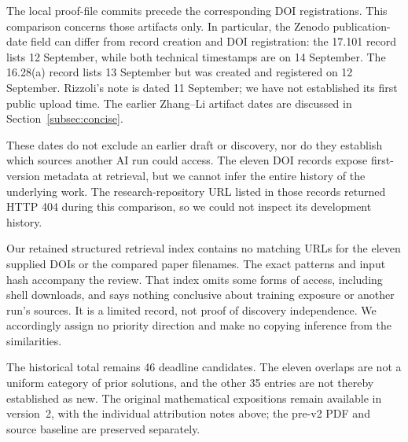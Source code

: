 

The local proof-file commits precede the corresponding DOI registrations.
This comparison concerns those artifacts only. In particular, the Zenodo
publication-date field can differ from record creation and DOI
registration: the 17.101 record lists 12 September, while both technical
timestamps are on 14 September. The 16.28(a) record lists 13 September
but was created and registered on 12 September. Rizzoli's note is dated
11 September; we have not established its first public upload time.
The earlier Zhang--Li artifact dates are discussed in
Section~\ref{subsec:concise}.

These dates do not exclude an earlier draft or discovery, nor do they
establish which sources another AI run could access. The eleven DOI
records expose first-version metadata at retrieval, but we cannot infer
the entire history of the underlying work. The research-repository URL
listed in those records returned HTTP 404 during this comparison, so
we could not inspect its development history.

Our retained structured retrieval index contains no matching URLs for
the eleven supplied DOIs or the compared paper filenames. The exact
patterns and input hash accompany the review. That index omits some
forms of access, including shell downloads, and says nothing conclusive
about training exposure or another run's sources. It is a limited record,
not proof of discovery independence. We accordingly assign no priority
direction and make no copying inference from the similarities.

The historical total remains 46 deadline candidates. The eleven
overlaps are not a uniform category of prior solutions, and the other
35 entries are not thereby established as new. The original mathematical
expositions remain available in version~2, with the individual attribution
notes above; the pre-v2 PDF and source baseline are preserved separately.
